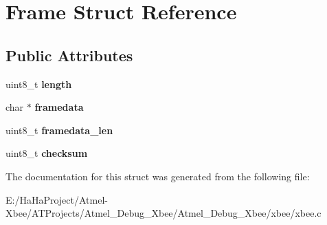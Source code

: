 \hypertarget{struct_frame}{}\section{Frame Struct Reference}
\label{struct_frame}
\subsection*{Public Attributes}
\begin{DoxyCompactItemize}
\item 
\mbox{\label{struct_frame_a548865beedb66d9db04b41e7e58dc026}} 
uint8\+\_\+t {\bfseries length}
\item 
\mbox{\label{struct_frame_a1486dd53d285d3222873c12cae1a0267}} 
char $\ast$ {\bfseries framedata}
\item 
\mbox{\label{struct_frame_a945f674a2a1d46921d9607c5b4b37fcc}} 
uint8\+\_\+t {\bfseries framedata\+\_\+len}
\item 
\mbox{\label{struct_frame_ad8e712a2c7d248a53f62712d15707e79}} 
uint8\+\_\+t {\bfseries checksum}
\end{DoxyCompactItemize}


The documentation for this struct was generated from the following file\+:\begin{DoxyCompactItemize}
\item 
E\+:/\+Ha\+Ha\+Project/\+Atmel-\/\+Xbee/\+A\+T\+Projects/\+Atmel\+\_\+\+Debug\+\_\+\+Xbee/\+Atmel\+\_\+\+Debug\+\_\+\+Xbee/xbee/xbee.\+c\end{DoxyCompactItemize}
